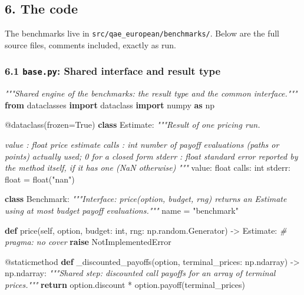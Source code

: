 \documentclass[
  10pt,
]{article}
\newenvironment{Shaded}{}{}
\newcommand{\AttributeTok}[1]{\textcolor[rgb]{0.49,0.56,0.16}{#1}}
\newcommand{\BuiltInTok}[1]{\textcolor[rgb]{0.00,0.50,0.00}{#1}}
\newcommand{\CommentTok}[1]{\textcolor[rgb]{0.38,0.63,0.69}{\textit{#1}}}
\newcommand{\ControlFlowTok}[1]{\textcolor[rgb]{0.00,0.44,0.13}{\textbf{#1}}}
\newcommand{\ImportTok}[1]{\textcolor[rgb]{0.00,0.50,0.00}{\textbf{#1}}}
\newcommand{\KeywordTok}[1]{\textcolor[rgb]{0.00,0.44,0.13}{\textbf{#1}}}
\newcommand{\NormalTok}[1]{#1}
\newcommand{\OperatorTok}[1]{\textcolor[rgb]{0.40,0.40,0.40}{#1}}
\newcommand{\PreprocessorTok}[1]{\textcolor[rgb]{0.74,0.48,0.00}{#1}}
\newcommand{\StringTok}[1]{\textcolor[rgb]{0.25,0.44,0.63}{#1}}
\newcommand{\VariableTok}[1]{\textcolor[rgb]{0.10,0.09,0.49}{#1}}
\begin{document}
\hypertarget{6-the-code}{%
\subsection{6. The code}\label{6-the-code}}

The benchmarks live in \texttt{src/qae\_european/benchmarks/}. Below are
the full source files, comments included, exactly as run.

\hypertarget{61-basepy-shared-interface-and-result-type}{%
\subsubsection{\texorpdfstring{6.1 \texttt{base.py}: Shared interface
and result
type}{6.1 base.py: Shared interface and result type}}\label{61-basepy-shared-interface-and-result-type}}

\begin{Shaded}
\begin{Highlighting}[]
\CommentTok{"""Shared engine of the benchmarks: the result type and the common interface."""}
\ImportTok{from}\NormalTok{ dataclasses }\ImportTok{import}\NormalTok{ dataclass}
\ImportTok{import}\NormalTok{ numpy }\ImportTok{as}\NormalTok{ np}


\AttributeTok{@dataclass}\NormalTok{(frozen}\OperatorTok{=}\VariableTok{True}\NormalTok{)}
\KeywordTok{class}\NormalTok{ Estimate:}
    \CommentTok{"""Result of one pricing run.}

\CommentTok{    value : float         price estimate}
\CommentTok{    calls : int           number of payoff evaluations (paths or points) actually used; 0 for a closed form}
\CommentTok{    stderr : float        standard error reported by the method itself, if it has one (NaN otherwise)}
\CommentTok{    """}
\NormalTok{    value: }\BuiltInTok{float}
\NormalTok{    calls: }\BuiltInTok{int}
\NormalTok{    stderr: }\BuiltInTok{float} \OperatorTok{=} \BuiltInTok{float}\NormalTok{(}\StringTok{"nan"}\NormalTok{)}


\KeywordTok{class}\NormalTok{ Benchmark:}
    \CommentTok{"""Interface: price(option, budget, rng) returns an Estimate using at most \textasciigrave{}budget\textasciigrave{} payoff evaluations."""}
\NormalTok{    name }\OperatorTok{=} \StringTok{"benchmark"}

    \KeywordTok{def}\NormalTok{ price(}\VariableTok{self}\NormalTok{, option, budget: }\BuiltInTok{int}\NormalTok{, rng: np.random.Generator) }\OperatorTok{{-}\textgreater{}}\NormalTok{ Estimate:  }\CommentTok{\# pragma: no cover}
        \ControlFlowTok{raise} \PreprocessorTok{NotImplementedError}

    \AttributeTok{@staticmethod}
    \KeywordTok{def}\NormalTok{ \_discounted\_payoffs(option, terminal\_prices: np.ndarray) }\OperatorTok{{-}\textgreater{}}\NormalTok{ np.ndarray:}
        \CommentTok{"""Shared step: discounted call payoffs for an array of terminal prices."""}
        \ControlFlowTok{return}\NormalTok{ option.discount }\OperatorTok{*}\NormalTok{ option.payoff(terminal\_prices)}
\end{Highlighting}
\end{Shaded}
\end{document}
